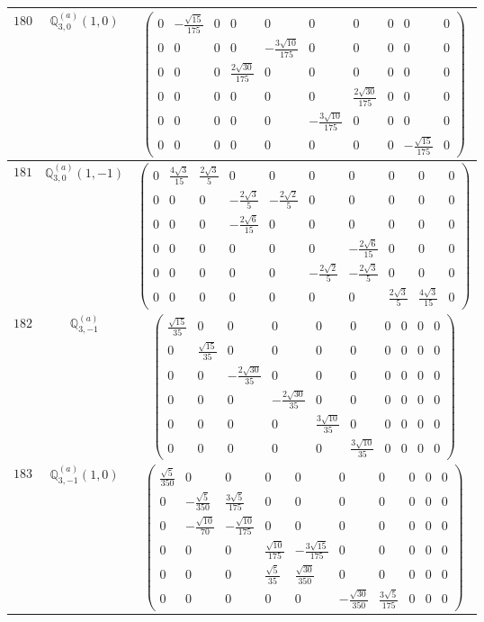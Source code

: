 \documentclass[fleqn,8pt,landscape]{jsarticle}
\begin{document}
\begin{center}
\begin{longtable}{ccc}
$ 180 $ & $ \mathbb{Q}_{3,0}^{(a)}(1,0) $ & $ \begin{pmatrix} 0 & - \frac{\sqrt{15}}{175} & 0 & 0 & 0 & 0 & 0 & 0 & 0 & 0 \\ 0 & 0 & 0 & 0 & - \frac{3 \sqrt{10}}{175} & 0 & 0 & 0 & 0 & 0 \\ 0 & 0 & 0 & \frac{2 \sqrt{30}}{175} & 0 & 0 & 0 & 0 & 0 & 0 \\ 0 & 0 & 0 & 0 & 0 & 0 & \frac{2 \sqrt{30}}{175} & 0 & 0 & 0 \\ 0 & 0 & 0 & 0 & 0 & - \frac{3 \sqrt{10}}{175} & 0 & 0 & 0 & 0 \\ 0 & 0 & 0 & 0 & 0 & 0 & 0 & 0 & - \frac{\sqrt{15}}{175} & 0 \end{pmatrix} $ \\ \hline
$ 181 $ & $ \mathbb{Q}_{3,0}^{(a)}(1,-1) $ & $ \begin{pmatrix} 0 & \frac{4 \sqrt{3}}{15} & \frac{2 \sqrt{3}}{5} & 0 & 0 & 0 & 0 & 0 & 0 & 0 \\ 0 & 0 & 0 & - \frac{2 \sqrt{3}}{5} & - \frac{2 \sqrt{2}}{5} & 0 & 0 & 0 & 0 & 0 \\ 0 & 0 & 0 & - \frac{2 \sqrt{6}}{15} & 0 & 0 & 0 & 0 & 0 & 0 \\ 0 & 0 & 0 & 0 & 0 & 0 & - \frac{2 \sqrt{6}}{15} & 0 & 0 & 0 \\ 0 & 0 & 0 & 0 & 0 & - \frac{2 \sqrt{2}}{5} & - \frac{2 \sqrt{3}}{5} & 0 & 0 & 0 \\ 0 & 0 & 0 & 0 & 0 & 0 & 0 & \frac{2 \sqrt{3}}{5} & \frac{4 \sqrt{3}}{15} & 0 \end{pmatrix} $ \\ \hline
$ 182 $ & $ \mathbb{Q}_{3,-1}^{(a)} $ & $ \begin{pmatrix} \frac{\sqrt{15}}{35} & 0 & 0 & 0 & 0 & 0 & 0 & 0 & 0 & 0 \\ 0 & \frac{\sqrt{15}}{35} & 0 & 0 & 0 & 0 & 0 & 0 & 0 & 0 \\ 0 & 0 & - \frac{2 \sqrt{30}}{35} & 0 & 0 & 0 & 0 & 0 & 0 & 0 \\ 0 & 0 & 0 & - \frac{2 \sqrt{30}}{35} & 0 & 0 & 0 & 0 & 0 & 0 \\ 0 & 0 & 0 & 0 & \frac{3 \sqrt{10}}{35} & 0 & 0 & 0 & 0 & 0 \\ 0 & 0 & 0 & 0 & 0 & \frac{3 \sqrt{10}}{35} & 0 & 0 & 0 & 0 \end{pmatrix} $ \\ \hline
$ 183 $ & $ \mathbb{Q}_{3,-1}^{(a)}(1,0) $ & $ \begin{pmatrix} \frac{\sqrt{5}}{350} & 0 & 0 & 0 & 0 & 0 & 0 & 0 & 0 & 0 \\ 0 & - \frac{\sqrt{5}}{350} & \frac{3 \sqrt{5}}{175} & 0 & 0 & 0 & 0 & 0 & 0 & 0 \\ 0 & - \frac{\sqrt{10}}{70} & - \frac{\sqrt{10}}{175} & 0 & 0 & 0 & 0 & 0 & 0 & 0 \\ 0 & 0 & 0 & \frac{\sqrt{10}}{175} & - \frac{3 \sqrt{15}}{175} & 0 & 0 & 0 & 0 & 0 \\ 0 & 0 & 0 & \frac{\sqrt{5}}{35} & \frac{\sqrt{30}}{350} & 0 & 0 & 0 & 0 & 0 \\ 0 & 0 & 0 & 0 & 0 & - \frac{\sqrt{30}}{350} & \frac{3 \sqrt{5}}{175} & 0 & 0 & 0 \end{pmatrix} $ \\ \hline

\end{longtable}
\end{center}
\end{document}
